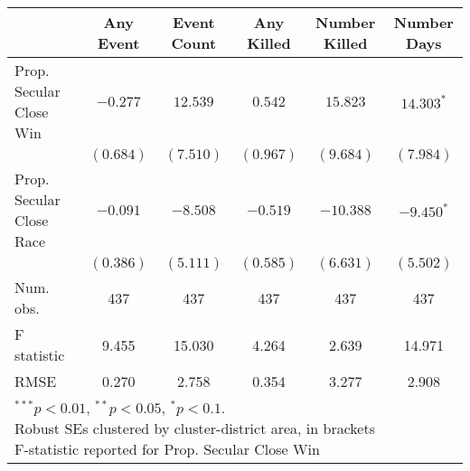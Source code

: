 
\begin{tabular}{l c c c c c }
\hline
 & Any Event & Event Count & Any Killed & Number Killed & Number Days \\
\hline
Prop. Secular Close Win  & $-0.277$  & $12.539$  & $0.542$   & $15.823$  & $14.303^{*}$ \\
                         & $(0.684)$ & $(7.510)$ & $(0.967)$ & $(9.684)$ & $(7.984)$    \\
Prop. Secular Close Race & $-0.091$  & $-8.508$  & $-0.519$  & $-10.388$ & $-9.450^{*}$ \\
                         & $(0.386)$ & $(5.111)$ & $(0.585)$ & $(6.631)$ & $(5.502)$    \\
\hline
Num. obs.                & 437       & 437       & 437       & 437       & 437          \\
F statistic              & 9.455     & 15.030    & 4.264     & 2.639     & 14.971       \\
RMSE                     & 0.270     & 2.758     & 0.354     & 3.277     & 2.908        \\
\hline
\multicolumn{6}{l}{\scriptsize{\parbox{.4\linewidth}{\vspace{2pt}$^{***}p<0.01$, $^{**}p<0.05$, $^*p<0.1$. \\
       Robust SEs clustered by cluster-district area, in brackets\\ F-statistic reported for Prop. Secular Close Win}}}
\end{tabular}
